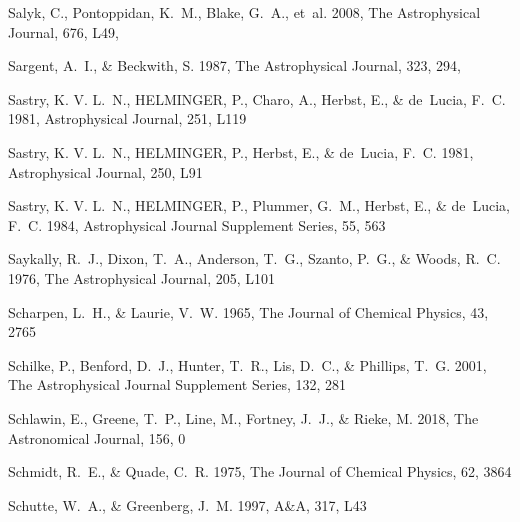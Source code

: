 \documentclass[twocolumn]{aastex631}
\begin{document}
\begin{thebibliography}{}
{Salyk}, C., {Pontoppidan}, K.~M., {Blake}, G.~A., {et~al.} 2008, The
  Astrophysical Journal, 676, L49, 

{Sargent}, A.~I., \& {Beckwith}, S. 1987, The Astrophysical Journal, 323, 294,

Sastry, K. V. L.~N., HELMINGER, P., Charo, A., Herbst, E., \& de~Lucia, F.~C.
  1981{}, Astrophysical Journal, 251, L119

Sastry, K. V. L.~N., HELMINGER, P., Herbst, E., \& de~Lucia, F.~C.
  1981{}, Astrophysical Journal, 250, L91

Sastry, K. V. L.~N., HELMINGER, P., Plummer, G.~M., Herbst, E., \& de~Lucia,
  F.~C. 1984, Astrophysical Journal Supplement Series, 55, 563

Saykally, R.~J., Dixon, T.~A., Anderson, T.~G., Szanto, P.~G., \& Woods, R.~C.
  1976, The Astrophysical Journal, 205, L101

Scharpen, L.~H., \& Laurie, V.~W. 1965, The Journal of Chemical Physics, 43,
  2765

Schilke, P., Benford, D.~J., Hunter, T.~R., Lis, D.~C., \& Phillips, T.~G.
  2001, The Astrophysical Journal Supplement Series, 132, 281

Schlawin, E., Greene, T.~P., Line, M., Fortney, J.~J., \& Rieke, M. 2018, The
  Astronomical Journal, 156, 0

Schmidt, R.~E., \& Quade, C.~R. 1975, The Journal of Chemical Physics, 62, 3864

Schutte, W.~A., \& Greenberg, J.~M. 1997, A{\&}A, 317, L43


\end{thebibliography}
\end{document}
